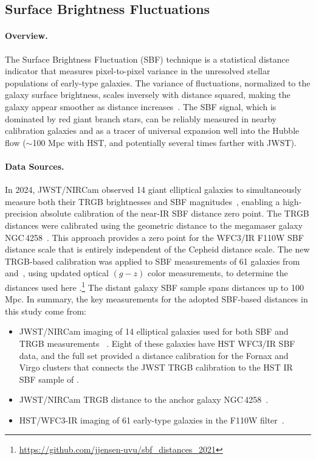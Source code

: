 \subsection{Surface Brightness Fluctuations}

\paragraph{Overview.}
The Surface Brightness Fluctuation (SBF) technique is a statistical distance indicator that measures pixel-to-pixel variance in the unresolved stellar populations of early-type galaxies. The variance of fluctuations, normalized to the galaxy surface brightness, scales inversely with distance squared, making the galaxy appear smoother as distance increases~\citep{1988AJ.....96..807T}.
The SBF signal, which is dominated by red giant branch stars, can be reliably  measured in nearby calibration galaxies and as a tracer of universal expansion well into the Hubble flow ($\sim$100 Mpc with HST, and potentially several times farther with JWST).

\paragraph{Data Sources.}
In 2024, JWST/NIRCam observed 14 giant elliptical galaxies to simultaneously measure both their TRGB brightnesses and SBF magnitudes~\citep{2024ApJ...973...83A,2025ApJ...982...26A}, enabling a high-precision absolute calibration of the near-IR SBF distance zero point. The TRGB distances were calibrated using the geometric distance to the megamaser galaxy NGC\,4258~\citep{2024ApJ...966...89A}. This approach provides a zero point for the WFC3/IR F110W SBF distance scale that is entirely independent of the Cepheid distance scale.  
The new TRGB-based calibration was applied to SBF measurements of 61 galaxies from~\citet{2021ApJS..255...21J} and~\citet{2021ApJ...911...65B}, using updated optical $({g-z})$ color measurements, to determine the distances used here \citep{2025ApJ...987...87J}.\footnote{\url{https://github.com/jjensen-uvu/sbf_distances_2021}} The distant galaxy SBF sample spans distances up to 100 Mpc. 
In summary, the key measurements for the adopted SBF-based distances in this study come from:
\begin{itemize}
    \item JWST/NIRCam imaging of 14 elliptical galaxies used for both SBF and TRGB measurements ~\citep{2024ApJ...973...83A,2025ApJ...982...26A}. Eight of these galaxies have HST WFC3/IR SBF data, and the full set provided a distance calibration for the Fornax and Virgo clusters that connects the JWST TRGB calibration to the HST IR SBF sample of \citet{2015ApJ...808...91J}.
    \item JWST/NIRCam TRGB distance to the anchor galaxy NGC\,4258~\citep{2024ApJ...966...89A}.
    \item HST/WFC3-IR imaging of 61 early-type galaxies in the F110W filter~\citep{2021ApJS..255...21J,2021ApJ...911...65B}.
\end{itemize}


